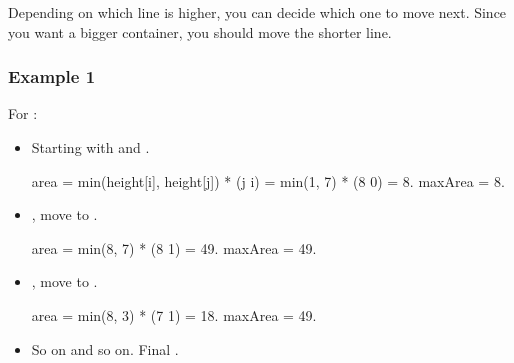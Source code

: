 \documentclass[letterpaper,12pt,english]{book}
\begin{document}
\sphinxAtStartPar
Depending on which line is higher, you can decide which one to move next. Since you want a bigger container, you should move the shorter line.


\subsubsection{Example 1}
\label{\detokenize{Two_Pointers/08_TP_11_Container_With_Most_Water:id1}}
\sphinxAtStartPar
For :
\begin{itemize}
\item {} 
\sphinxAtStartPar
Starting with  and .

\begin{sphinxVerbatim}[commandchars=\\\{\}]
area = min(height[i], height[j]) * (j \PYGZhy{} i) = min(1, 7) * (8 \PYGZhy{} 0) = 8.
maxArea = 8.
\end{sphinxVerbatim}

\item {} 
\sphinxAtStartPar
{}, move  to .

\begin{sphinxVerbatim}[commandchars=\\\{\}]
area = min(8, 7) * (8 \PYGZhy{} 1) = 49.
maxArea = 49.
\end{sphinxVerbatim}

\item {} 
\sphinxAtStartPar
{}, move  to .

\begin{sphinxVerbatim}[commandchars=\\\{\}]
area = min(8, 3) * (7 \PYGZhy{} 1) = 18.
maxArea = 49.
\end{sphinxVerbatim}

\item {} 
\sphinxAtStartPar
So on and so on. Final .

\end{itemize}
\end{document}
